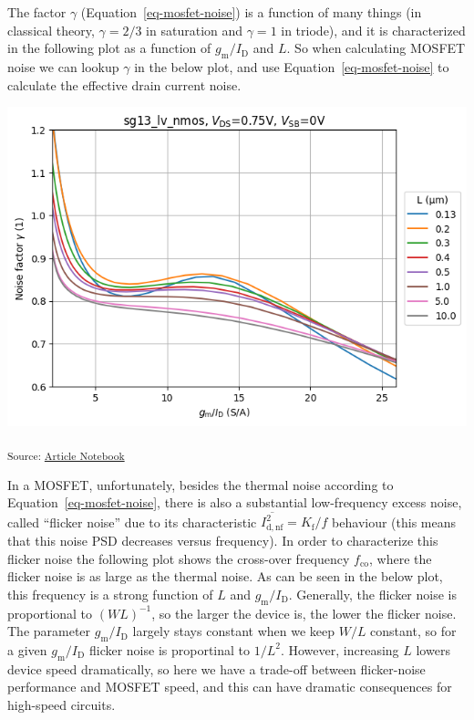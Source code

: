 \documentclass[
  a4paper,
  DIV=11,
  numbers=noendperiod]{scrartcl}
\begin{document}
The factor \(\gamma\) (Equation~\ref{eq-mosfet-noise}) is a function of
many things (in classical theory, \(\gamma = 2/3\) in saturation and
\(\gamma = 1\) in triode), and it is characterized in the following plot
as a function of \(g_\mathrm{m}/I_\mathrm{D}\) and \(L\). So when
calculating MOSFET noise we can lookup \(\gamma\) in the below plot, and
use Equation~\ref{eq-mosfet-noise} to calculate the effective drain
current noise.

\includegraphics{index_files/figure-latex/.-sizing-techsweep_sg13_plots_nmos-cell-13-output-1.png}

\textsubscript{Source:
\href{https://iic-jku.github.io/analog-circuit-design/index.qmd.html}{Article
Notebook}}

In a MOSFET, unfortunately, besides the thermal noise according to
Equation~\ref{eq-mosfet-noise}, there is also a substantial
low-frequency excess noise, called ``flicker noise'' due to its
characteristic \(\overline{I_\mathrm{d,nf}^2} = K_\mathrm{f}/f\)
behaviour (this means that this noise PSD decreases versus frequency).
In order to characterize this flicker noise the following plot shows the
cross-over frequency \(f_\mathrm{co}\), where the flicker noise is as
large as the thermal noise. As can be seen in the below plot, this
frequency is a strong function of \(L\) and
\(g_\mathrm{m}/I_\mathrm{D}\). Generally, the flicker noise is
proportional to \((W L)^{-1}\), so the larger the device is, the lower
the flicker noise. The parameter \(g_\mathrm{m}/I_\mathrm{D}\) largely
stays constant when we keep \(W/L\) constant, so for a given
\(g_\mathrm{m}/I_\mathrm{D}\) flicker noise is proportinal to \(1/L^2\).
However, increasing \(L\) lowers device speed dramatically, so here we
have a trade-off between flicker-noise performance and MOSFET speed, and
this can have dramatic consequences for high-speed circuits.
\end{document}

